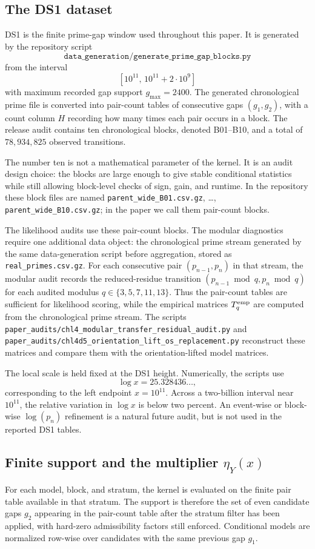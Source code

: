 \documentclass[10pt]{article}
\begin{document}
\subsection{The DS1 dataset}
DS1 is the finite prime-gap window used throughout this paper.  It is generated by the repository script
\[
\texttt{data\_generation/generate\_prime\_gap\_blocks.py}
\]
from the interval
\[
[10^{11},\,10^{11}+2\cdot 10^9]
\]
with maximum recorded gap support $g_{\max}=2400$.  The generated chronological prime file is converted into pair-count tables of consecutive gaps $(g_1,g_2)$, with a count column $H$ recording how many times each pair occurs in a block.  The release audit contains ten chronological blocks, denoted B01--B10, and a total of $78{,}934{,}825$ observed transitions.

The number ten is not a mathematical parameter of the kernel.  It is an audit design choice: the blocks are large enough to give stable conditional statistics while still allowing block-level checks of sign, gain, and runtime.  In the repository these block files are named \texttt{parent\_wide\_B01.csv.gz}, \ldots, \texttt{parent\_wide\_B10.csv.gz}; in the paper we call them pair-count blocks.

The likelihood audits use these pair-count blocks.  The modular diagnostics require one additional data object: the chronological prime stream generated by the same data-generation script before aggregation, stored as \texttt{real\_primes.csv.gz}.  For each consecutive pair $(p_{n-1},p_n)$ in that stream, the modular audit records the reduced-residue transition $(p_{n-1}\bmod q,p_n\bmod q)$ for each audited modulus $q\in\{3,5,7,11,13\}$.  Thus the pair-count tables are sufficient for likelihood scoring, while the empirical matrices $T_q^{\rm emp}$ are computed from the chronological prime stream.  The scripts \texttt{paper\_audits/chl4\_modular\_transfer\_residual\_audit.py} and \texttt{paper\_audits/chl4d5\_orientation\_lift\_os\_replacement.py} reconstruct these matrices and compare them with the orientation-lifted model matrices.

The local scale is held fixed at the DS1 height.  Numerically, the scripts use
\[
\log x=25.328436\ldots,
\]
corresponding to the left endpoint $x=10^{11}$.  Across a two-billion interval near $10^{11}$, the relative variation in $\log x$ is below two percent.  An event-wise or block-wise $\log(p_n)$ refinement is a natural future audit, but is not used in the reported DS1 tables.

\subsection{Finite support and the multiplier \texorpdfstring{$\eta_Y(x)$}{eta\_Y(x)}}
For each model, block, and stratum, the kernel is evaluated on the finite pair table available in that stratum.  The support is therefore the set of even candidate gaps $g_2$ appearing in the pair-count table after the stratum filter has been applied, with hard-zero admissibility factors still enforced.  Conditional models are normalized row-wise over candidates with the same previous gap $g_1$.
\end{document}
